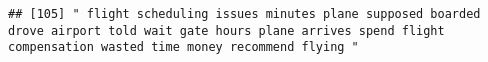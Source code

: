 \documentclass[
]{article}
\begin{document}
\begin{verbatim}
## [105] " flight scheduling issues minutes plane supposed boarded drove airport told wait gate hours plane arrives spend flight compensation wasted time money recommend flying "                                                                                                                                                                                                                                                                                                                                                                                                                                                                                                                                                                                                                                                                                                                                                                                                                                                                                                                                                                                                                                                                                                                                                                                                                                                                                                                                                                                                                                                                                                                                                                                                                       

\end{verbatim}
\end{document}
